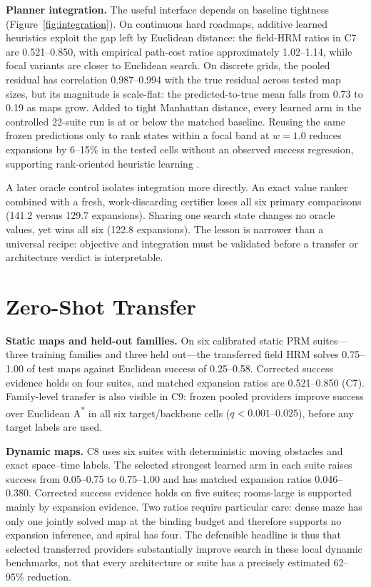 \documentclass[letterpaper]{article} %
\newcommand{\stage}[1]{\textsc{#1}}
\begin{document}
\textbf{Planner integration.} The useful interface depends on baseline tightness (Figure~\ref{fig:integration}). On continuous hard roadmaps, additive learned heuristics exploit the gap left by Euclidean distance: the field-HRM ratios in \stage{C7} are 0.521--0.850, with empirical path-cost ratios approximately 1.02--1.14, while focal variants are closer to Euclidean search. On discrete grids, the pooled residual has correlation 0.987--0.994 with the true residual across tested map sizes, but its magnitude is scale-flat: the predicted-to-true mean falls from 0.73 to 0.19 as maps grow. Added to tight Manhattan distance, every learned arm in the controlled 22-suite run is at or below the matched baseline. Reusing the same frozen predictions only to rank states within a focal band at $w=1.0$ reduces expansions by 6--15\% in the tested cells without an observed success regression, supporting rank-oriented heuristic learning \citep{chrestien2023rank}.

A later oracle control isolates integration more directly. An exact value ranker combined with a fresh, work-discarding certifier loses all six primary comparisons (141.2 versus 129.7 expansions). Sharing one search state changes no oracle values, yet wins all six (122.8 expansions). The lesson is narrower than a universal recipe: objective and integration must be validated before a transfer or architecture verdict is interpretable.

\section{Zero-Shot Transfer}

\textbf{Static maps and held-out families.} On six calibrated static PRM suites---three training families and three held out---the transferred field HRM solves 0.75--1.00 of test maps against Euclidean success of 0.25--0.58. Corrected success evidence holds on four suites, and matched expansion ratios are 0.521--0.850 (\stage{C7}). Family-level transfer is also visible in \stage{C9}: frozen pooled providers improve success over Euclidean A\textsuperscript{*} in all six target/backbone cells ($q<0.001$--$0.025$), before any target labels are used.

\textbf{Dynamic maps.} \stage{C8} uses six suites with deterministic moving obstacles and exact space--time labels. The selected strongest learned arm in each suite raises success from 0.05--0.75 to 0.75--1.00 and has matched expansion ratios 0.046--0.380. Corrected success evidence holds on five suites; rooms-large is supported mainly by expansion evidence. Two ratios require particular care: dense maze has only one jointly solved map at the binding budget and therefore supports no expansion inference, and spiral has four. The defensible headline is thus that selected transferred providers substantially improve search in these local dynamic benchmarks, not that every architecture or suite has a precisely estimated 62--95\% reduction.
\end{document}
